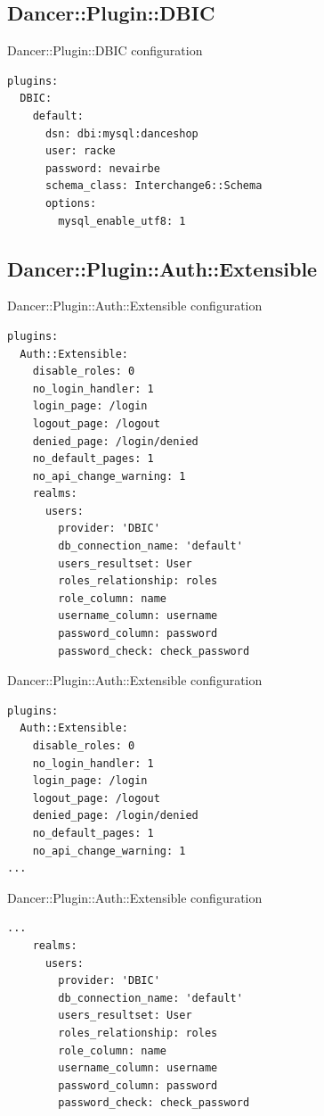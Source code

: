 \subsection{Dancer::Plugin::DBIC}
\begin{frame}[fragile]{Dancer::Plugin::DBIC configuration}
\begin{lstlisting}
plugins:
  DBIC:
    default:
      dsn: dbi:mysql:danceshop
      user: racke
      password: nevairbe
      schema_class: Interchange6::Schema
      options:
        mysql_enable_utf8: 1
\end{lstlisting}
\end{frame}

\subsection{Dancer::Plugin::Auth::Extensible}
\begin{frame}[fragile]{Dancer::Plugin::Auth::Extensible configuration}
\begin{lstlisting}
plugins:
  Auth::Extensible:
    disable_roles: 0
    no_login_handler: 1
    login_page: /login
    logout_page: /logout
    denied_page: /login/denied
    no_default_pages: 1
    no_api_change_warning: 1
    realms:
      users:
        provider: 'DBIC'
        db_connection_name: 'default'
        users_resultset: User
        roles_relationship: roles
        role_column: name
        username_column: username
        password_column: password
        password_check: check_password
\end{lstlisting}
\end{frame}

\begin{frame}[fragile]{Dancer::Plugin::Auth::Extensible configuration}
\begin{lstlisting}
plugins:
  Auth::Extensible:
    disable_roles: 0
    no_login_handler: 1
    login_page: /login
    logout_page: /logout
    denied_page: /login/denied
    no_default_pages: 1
    no_api_change_warning: 1
...
\end{lstlisting}
\end{frame}

\begin{frame}[fragile]{Dancer::Plugin::Auth::Extensible configuration}
\begin{lstlisting}
...
    realms:
      users:
        provider: 'DBIC'
        db_connection_name: 'default'
        users_resultset: User
        roles_relationship: roles
        role_column: name
        username_column: username
        password_column: password
        password_check: check_password
\end{lstlisting}
\end{frame}

